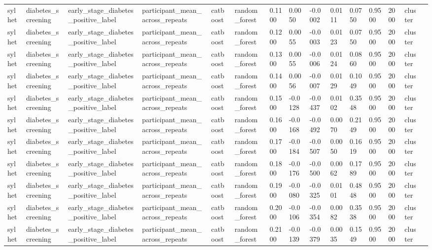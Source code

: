 \begin{tabular}{lllllllllllllll}
sylhet & diabetes\_screening & early\_stage\_diabetes\_positive\_label & participant\_mean\_across\_repeats & catboost & random\_forest & 0.1100 & 0.0050 & -0.0002 & 0.0111 & 0.0750 & 0.9500 & 2000 & cluster &  \\
sylhet & diabetes\_screening & early\_stage\_diabetes\_positive\_label & participant\_mean\_across\_repeats & catboost & random\_forest & 0.1200 & 0.0055 & -0.0003 & 0.0123 & 0.0750 & 0.9500 & 2000 & cluster &  \\
sylhet & diabetes\_screening & early\_stage\_diabetes\_positive\_label & participant\_mean\_across\_repeats & catboost & random\_forest & 0.1300 & 0.0055 & -0.0006 & 0.0124 & 0.0860 & 0.9500 & 2000 & cluster &  \\
sylhet & diabetes\_screening & early\_stage\_diabetes\_positive\_label & participant\_mean\_across\_repeats & catboost & random\_forest & 0.1400 & 0.0056 & -0.0007 & 0.0129 & 0.1049 & 0.9500 & 2000 & cluster &  \\
sylhet & diabetes\_screening & early\_stage\_diabetes\_positive\_label & participant\_mean\_across\_repeats & catboost & random\_forest & 0.1500 & -0.0128 & -0.0437 & 0.0102 & 0.3548 & 0.9500 & 2000 & cluster &  \\
sylhet & diabetes\_screening & early\_stage\_diabetes\_positive\_label & participant\_mean\_across\_repeats & catboost & random\_forest & 0.1600 & -0.0168 & -0.0492 & 0.0070 & 0.2149 & 0.9500 & 2000 & cluster &  \\
sylhet & diabetes\_screening & early\_stage\_diabetes\_positive\_label & participant\_mean\_across\_repeats & catboost & random\_forest & 0.1700 & -0.0184 & -0.0507 & 0.0050 & 0.1619 & 0.9500 & 2000 & cluster &  \\
sylhet & diabetes\_screening & early\_stage\_diabetes\_positive\_label & participant\_mean\_across\_repeats & catboost & random\_forest & 0.1800 & -0.0176 & -0.0500 & 0.0062 & 0.1789 & 0.9500 & 2000 & cluster &  \\
sylhet & diabetes\_screening & early\_stage\_diabetes\_positive\_label & participant\_mean\_across\_repeats & catboost & random\_forest & 0.1900 & -0.0080 & -0.0325 & 0.0101 & 0.4848 & 0.9500 & 2000 & cluster &  \\
sylhet & diabetes\_screening & early\_stage\_diabetes\_positive\_label & participant\_mean\_across\_repeats & catboost & random\_forest & 0.2000 & -0.0106 & -0.0354 & 0.0082 & 0.3538 & 0.9500 & 2000 & cluster &  \\
sylhet & diabetes\_screening & early\_stage\_diabetes\_positive\_label & participant\_mean\_across\_repeats & catboost & random\_forest & 0.2100 & -0.0139 & -0.0379 & 0.0035 & 0.1549 & 0.9500 & 2000 & cluster &  \\

\end{tabular}
